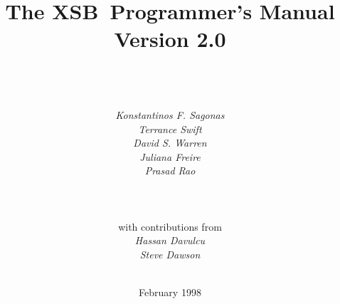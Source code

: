 \documentclass[11pt]{report}
\newcommand{\ourprolog}{XSB}
\newcommand{\version}{Version 2.0}
\begin{document}
\title{\bf The \ourprolog\ Programmer's Manual \\ \version}

\author{{\epsfxsize=230pt }\\
	\ \\ \ \\
	{\em Konstantinos F. Sagonas} \\
	{\em Terrance Swift} \\
	{\em David S. Warren} \\ 
	{\em Juliana Freire} \\
	{\em Prasad Rao} \\
	\ \\ \\ \\
	{\normalsize with contributions from} \\
	{\em Hassan Davulcu} \\
	{\em Steve Dawson} \\
	\ \\
} 

\date{February 1998}

\maketitle



\thispagestyle{empty}

\newpage
\thispagestyle{empty}
%

\tableofcontents
\newpage	%
  

















%

\appendix




%




\end{document}
